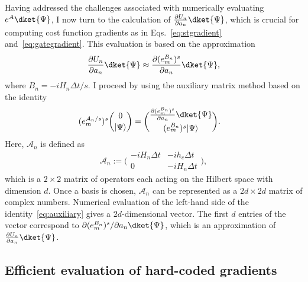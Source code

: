 Having addressed the challenges associated with numerically evaluating $e^A\dket{\Psi}$, I now turn to the calculation of $\frac{\partial U_n}{\partial a_n} \dket{\Psi}$, which is crucial for computing cost function gradients as in Eqs.~\eqref{eq:stgradient} and~\eqref{eq:gategradient}. This evaluation is based on the approximation 
\begin{align}
    \frac{\partial U_n}{\partial a_n} \dket{\Psi}\approx \frac{\partial (e^{B_n}_m)^s}{\partial a_n} \dket{\Psi},
\end{align}
where $B_n={-iH_n\Delta t}/{s}$. I proceed by using the auxiliary matrix method based on the identity~\cite{auxigoodwin2015auxiliary,najfeld1995derivatives}
\begin{equation}
\label{eq:auxiliary}
    \begin{aligned}
    (e^{\mathcal{A}_n/s}_m)^s
    \binom{0}{|\Psi\rangle}&=
    \binom{
    \frac{\partial (e^{B_{n}}_m)^s}{\partial a_n}  \dket{\Psi}}{{(e^{B_n}_m)^s|\Psi\rangle}}.
\end{aligned}
\end{equation}
Here, $\mathcal{A}_n$ is defined as
\begin{equation}
\mathcal{A}_n:=
{\biggl(\begin{matrix}
-iH_n \Delta t& -ih_c\Delta t \\
0 & -iH_n\Delta t
\end{matrix}\biggr)},
\end{equation}
which is a $2\times2$ matrix of operators each acting on the Hilbert space with dimension $d$. Once a basis is chosen, $\mathcal{A}_n$ can be represented as a $2d\times2d$ matrix of complex numbers. Numerical evaluation of the left-hand side of the identity~\eqref{eq:auxiliary} gives a $2d$-dimensional vector. The first $d$ entries of the vector correspond to $\partial (e^{B_n}_m)^s / \partial a_n \dket{\Psi}$, which is an approximation of $\frac{\partial U_n}{\partial a_n} \dket{\Psi}$. 

\subsection{Efficient evaluation of hard-coded gradients}
\label{sec:forward_backward}

